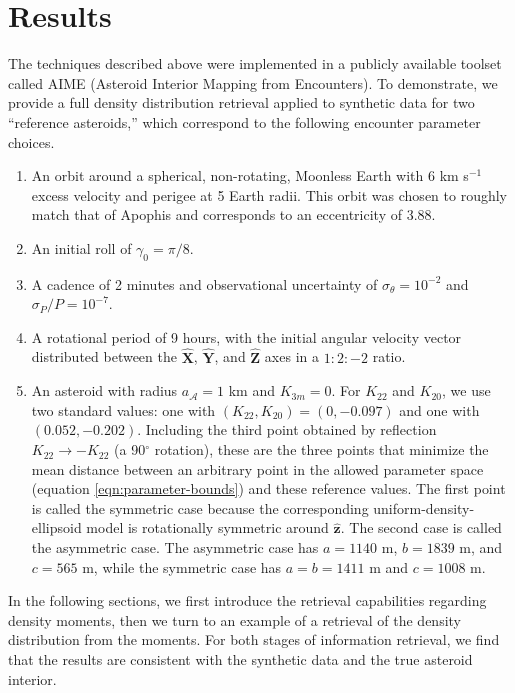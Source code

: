 \documentclass[fleqn,usenatbib]{mnras}
\newcommand{\unit}[1]{\bm{\hat{#1}}}
\begin{document}
\section{Results}
\label{sec:results}

The techniques described above were implemented in a publicly available toolset called AIME (Asteroid Interior Mapping from Encounters). To demonstrate, we provide a full density distribution retrieval applied to synthetic data for two ``reference asteroids,'' which correspond to the following encounter parameter choices.

\begin{enumerate}
  \item An orbit around a spherical, non-rotating, Moonless Earth with $6$ km s$^{-1}$ excess velocity and perigee at 5 Earth radii. This orbit was chosen to roughly match that of Apophis and corresponds to an eccentricity of 3.88. 
  \item An initial roll of $\gamma_0=\pi/8$.
  \item A cadence of 2 minutes and observational uncertainty of $\sigma_\theta = 10^{-2}$ and $\sigma_P / P = 10^{-7}$.
  \item A rotational period of 9 hours, with the initial angular velocity vector distributed between the $\unit X$, $\unit Y$, and $\unit Z$ axes in a $1:2:-2$ ratio.
  \item An asteroid with radius $a_\mathcal{A} = 1$ km and $K_{3m}=0$. For $K_{22}$ and $K_{20}$, we use two standard values: one with $(K_{22}, K_{20}) = (0, -0.097)$ and one with $(0.052, -0.202)$. Including the third point obtained by reflection $K_{22}\rightarrow -K_{22}$ (a 90$^\circ$ rotation), these are the three points that minimize the mean distance between an arbitrary point in the allowed parameter space (equation \ref{eqn:parameter-bounds}) and these reference values. The first point is called the symmetric case because the corresponding uniform-density-ellipsoid model is rotationally symmetric around $\unit z$. The second case is called the asymmetric case. The asymmetric case has $a=1140$ m, $b=1839$ m, and $c=565$ m, while the symmetric case has $a=b=1411$ m and $c=1008$ m.
\end{enumerate}

In the following sections, we first introduce the retrieval capabilities regarding density moments, then we turn to an example of a retrieval of the density distribution from the moments. For both stages of information retrieval, we find that the results are consistent with the synthetic data and the true asteroid interior.
\end{document}
